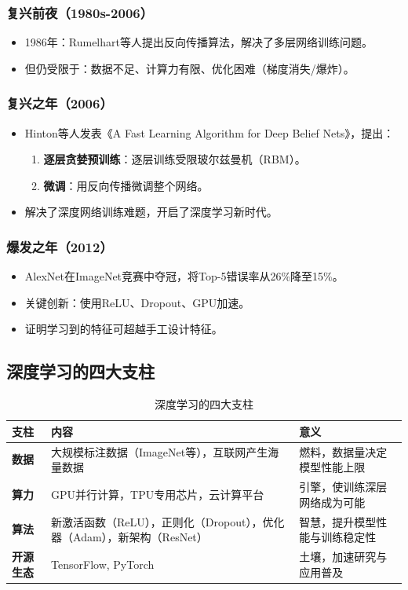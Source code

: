 \subsubsection{复兴前夜（1980s-2006）}
\begin{itemize}
    \item 1986年：Rumelhart等人提出反向传播算法，解决了多层网络训练问题。
    \item 但仍受限于：数据不足、计算力有限、优化困难（梯度消失/爆炸）。
\end{itemize}

\subsubsection{复兴之年（2006）}
\begin{itemize}
    \item Hinton等人发表《A Fast Learning Algorithm for Deep Belief Nets》，提出：
    \begin{enumerate}
        \item \textbf{逐层贪婪预训练}：逐层训练受限玻尔兹曼机（RBM）。
        \item \textbf{微调}：用反向传播微调整个网络。
    \end{enumerate}
    \item 解决了深度网络训练难题，开启了深度学习新时代。
\end{itemize}

\subsubsection{爆发之年（2012）}
\begin{itemize}
    \item AlexNet在ImageNet竞赛中夺冠，将Top-5错误率从26\%降至15\%。
    \item 关键创新：使用ReLU、Dropout、GPU加速。
    \item 证明学习到的特征可超越手工设计特征。
\end{itemize}

\subsection{深度学习的四大支柱}

\begin{table}[h]
\centering
\caption{深度学习的四大支柱}
\begin{tabular}{p{}p{}p{}}
\toprule
\textbf{支柱} & \textbf{内容} & \textbf{意义} \\
\midrule
\textbf{数据} & 
大规模标注数据（ImageNet等），互联网产生海量数据 &
燃料，数据量决定模型性能上限 \\
\textbf{算力} &GPU并行计算，TPU专用芯片，云计算平台
 &
引擎，使训练深层网络成为可能 \\
\textbf{算法} &
新激活函数（ReLU），正则化（Dropout），优化器（Adam），新架构（ResNet）
 &
智慧，提升模型性能与训练稳定性 \\
\textbf{开源生态} &TensorFlow, PyTorch &
土壤，加速研究与应用普及 \\
\bottomrule
\end{tabular}
\end{table}

